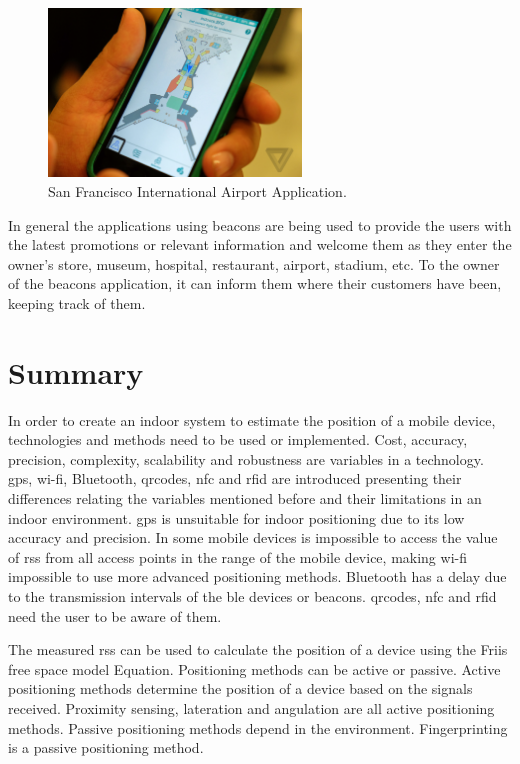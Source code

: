 \begin{figure}[!htb]
  \centering
  \includegraphics[width=0.6\textwidth]{Figures/sanfrancisco_data.jpg}
  \caption[San Francisco International Airport Map]{San Francisco International Airport Application.}
  \label{fig:sanfranapp}
\end{figure}


In general the applications using beacons are being used to provide the users with the latest promotions or relevant information and welcome them as they enter the owner's store, museum, hospital, restaurant, airport, stadium, etc. 
To the owner of the beacons application, it can inform them where their customers have been, keeping track of them.



\section{Summary}
\label{section:summarybackground}
In order to create an indoor system to estimate the position of a mobile device, technologies and methods need to be used or implemented. Cost, accuracy, precision, complexity, scalability and robustness are variables in a technology. \gls{gps}, \gls{wi-fi}, Bluetooth, \gls{qrcodes}, \gls{nfc} and \gls{rfid} are introduced presenting their differences relating the variables mentioned before and their limitations in an indoor environment. \gls{gps} is unsuitable for indoor positioning due to its low accuracy and precision. In some mobile devices is impossible to access the value of \gls{rss} from all access points in the range of the mobile device, making \gls{wi-fi} impossible to use more advanced positioning methods. Bluetooth has a delay due to the transmission intervals of the \gls{ble} devices or beacons. \gls{qrcodes}, \gls{nfc} and \gls{rfid} need the user to be aware of them. 

The measured \gls{rss} can be used to calculate the position of a device using the Friis free space model Equation.
Positioning methods can be active or passive. Active positioning methods determine the position of a device based on the signals received. Proximity sensing, lateration and angulation are all active positioning methods. Passive positioning methods depend in the environment. Fingerprinting is a passive positioning method.

